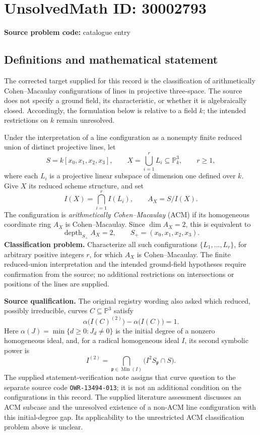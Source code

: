 \documentclass[11pt]{article}
\begin{document}
\section*{UnsolvedMath ID: 30002793}
\textbf{Source problem code:} catalogue entry
\subsection{Definitions and mathematical statement}
The corrected target supplied for this record is the classification of arithmetically Cohen--Macaulay configurations of lines in projective three-space. The source does not specify a ground field, its characteristic, or whether it is algebraically closed. Accordingly, the formulation below is relative to a field \(k\); the intended restrictions on \(k\) remain unresolved.

Under the interpretation of a line configuration as a nonempty finite reduced union of distinct projective lines, let
\[
S=k[x_0,x_1,x_2,x_3],\qquad
X=\bigcup_{i=1}^{r}L_i\subseteq\mathbb P^3_k,\qquad r\geq 1,
\]
where each \(L_i\) is a projective linear subspace of dimension one defined over \(k\). Give \(X\) its reduced scheme structure, and set
\[
I(X)=\bigcap_{i=1}^{r}I(L_i),\qquad A_X=S/I(X).
\]
The configuration is \emph{arithmetically Cohen--Macaulay} (ACM) if its homogeneous coordinate ring \(A_X\) is Cohen--Macaulay. Since \(\dim A_X=2\), this is equivalent to
\[
\operatorname{depth}_{S_+}A_X=2,
\qquad S_+=(x_0,x_1,x_2,x_3).
\]
\textbf{Classification problem.} Characterize all such configurations \(\{L_1,\ldots,L_r\}\), for arbitrary positive integers \(r\), for which \(A_X\) is Cohen--Macaulay. The finite reduced-union interpretation and the intended ground-field hypotheses require confirmation from the source; no additional restrictions on intersections or positions of the lines are supplied.

\textbf{Source qualification.} The original registry wording also asked which reduced, possibly irreducible, curves \(C\subseteq\mathbb P^3\) satisfy
\[
\alpha\bigl(I(C)^{(2)}\bigr)-\alpha\bigl(I(C)\bigr)=1.
\]
Here \(\alpha(J)=\min\{d\geq 0:J_d\neq 0\}\) is the initial degree of a nonzero homogeneous ideal, and, for a radical homogeneous ideal \(I\), its second symbolic power is
\[
I^{(2)}=\bigcap_{\mathfrak p\in\operatorname{Min}(I)}\bigl(I^2S_{\mathfrak p}\cap S\bigr).
\]
The supplied statement-verification note assigns that curve question to the separate source code \texttt{OWR-13494-013}; it is not an additional condition on the configurations in this record. The supplied literature assessment discusses an ACM subcase and the unresolved existence of a non-ACM line configuration with this initial-degree gap. Its applicability to the unrestricted ACM classification problem above is unclear.
\end{document}

